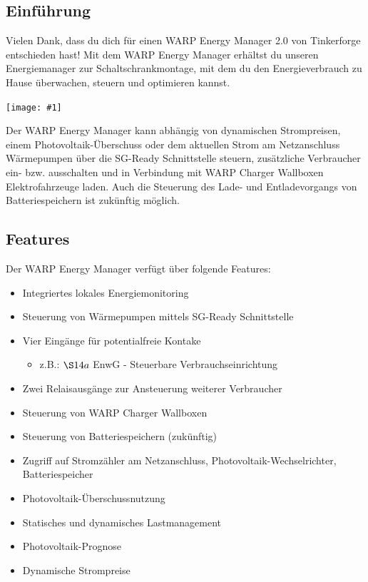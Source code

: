 \documentclass[a4paper,10pt]{article}
\newcommand{\gfx}[1]{\texttt{[image: \#1]}}
\begin{document}
\begin{multicols*}{2}
	\tableofcontents
	\newpage
	\section{Einführung}
	Vielen Dank, dass du dich für einen WARP Energy Manager 2.0 von Tinkerforge entschieden hast!
	Mit dem WARP Energy Manager
	erhältst du unseren Energiemanager zur Schaltschrankmontage, mit dem du den
	Energieverbrauch zu Hause überwachen, steuern und optimieren kannst.

	\gfx{./img_v2/warp-energy-manager2.png}

	Der WARP Energy Manager kann abhängig von dynamischen Strompreisen, einem Photovoltaik-Überschuss oder dem aktuellen Strom am Netzanschluss
    Wärmepumpen über die SG-Ready Schnittstelle steuern, zusätzliche Verbraucher ein- bzw. ausschalten und in Verbindung mit WARP Charger Wallboxen 
    Elektrofahrzeuge laden. Auch die Steuerung des Lade- und Entladevorgangs von Batteriespeichern ist zukünftig möglich.

	\subsection{Features}
	Der WARP Energy Manager verfügt über folgende Features:
    
    \begin{itemize}
        \item Integriertes lokales Energiemonitoring
        \item Steuerung von Wärmepumpen mittels SG-Ready Schnittstelle
        \item Vier Eingänge für potentialfreie Kontake
        \begin{itemize}
            \item z.B.: $\S14a$ EnwG - Steuerbare Verbrauchseinrichtung
        \end{itemize}
        \item Zwei Relaisausgänge zur Ansteuerung weiterer Verbraucher
        \item Steuerung von WARP Charger Wallboxen
		\item Steuerung von Batteriespeichern (zukünftig)
        \item Zugriff auf Stromzähler am Netzanschluss, Photovoltaik-Wechselrichter, Batteriespeicher
        \item Photovoltaik-Überschussnutzung
        \item Statisches und dynamisches Lastmanagement
        \item Photovoltaik-Prognose
        \item Dynamische Strompreise
    \end{itemize}
    

\end{multicols*}
\end{document}
